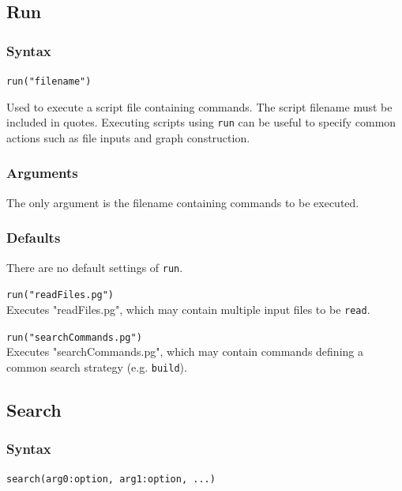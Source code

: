 \subsection{Run}
	\subsubsection{Syntax}
		\texttt{run("filename")}
		
	\begin{phygdescription}
		{Used to execute a \phyg script file containing commands. The script filename must be 
		included in quotes. 
		Executing scripts using \texttt{run} can be useful to specify common actions such as file inputs 
		and graph construction. }
	\end{phygdescription}
	
	\subsubsection{Arguments}
		The only argument is the filename containing commands to be executed.
		
	\subsubsection{Defaults}
		There are no default settings of \texttt{run}. 
	
	\begin{example}
		\item{\texttt{run("readFiles.pg")}\\ Executes "readFiles.pg", which may contain multiple input 
		files to be \texttt{read}.}
		
		\item{\texttt{run("searchCommands.pg")}\\ Executes "searchCommands.pg", which may 
		contain commands defining a common search strategy (e.g. \texttt{build}).}
	\end{example}

\subsection{Search}
	\subsubsection{Syntax}
		\texttt{search(arg0:option, arg1:option, ...)}
	
